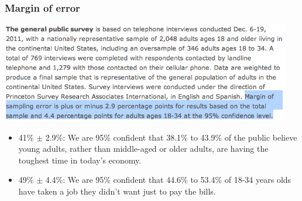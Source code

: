 \begin{frame}
\frametitle{Margin of error}

\begin{center}
\includegraphics[width=0.95\textwidth]{5-1_var_in_est/figures/pew/pew4}
\end{center}

\begin{itemize}

\item 41\% $\pm$ 2.9\%: We are 95\% confident that 38.1\% to 43.9\% of the public believe young adults, rather than middle-aged or older adults, are having the toughest time in today's economy.


\item 49\% $\pm$ 4.4\%: We are 95\% confident that 44.6\% to 53.4\% of 18-34 years olds have taken a job they didn't want just to pay the bills.

\end{itemize}

\end{frame}


